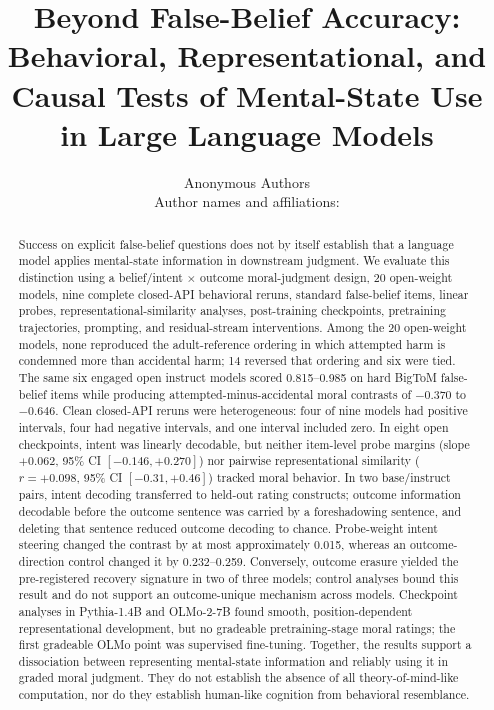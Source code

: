 \documentclass[11pt]{article}
\title{\textbf{Beyond False-Belief Accuracy:}\\
Behavioral, Representational, and Causal Tests of Mental-State Use in Large Language Models}
\author{Anonymous Authors\\
\small Author names and affiliations: \missinginfo}
\date{}
\begin{document}
\maketitle

\begin{abstract}
Success on explicit false-belief questions does not by itself establish that a language model applies mental-state information in downstream judgment.
We evaluate this distinction using a belief/intent $\times$ outcome moral-judgment design, 20 open-weight models, nine complete closed-API behavioral reruns, standard false-belief items, linear probes, representational-similarity analyses, post-training checkpoints, pretraining trajectories, prompting, and residual-stream interventions.
Among the 20 open-weight models, none reproduced the adult-reference ordering in which attempted harm is condemned more than accidental harm; 14 reversed that ordering and six were tied.
The same six engaged open instruct models scored 0.815--0.985 on hard BigToM false-belief items while producing attempted-minus-accidental moral contrasts of $-0.370$ to $-0.646$.
Clean closed-API reruns were heterogeneous: four of nine models had positive intervals, four had negative intervals, and one interval included zero.
In eight open checkpoints, intent was linearly decodable, but neither item-level probe margins (slope $+0.062$, 95\% CI $[-0.146,+0.270]$) nor pairwise representational similarity ($r=+0.098$, 95\% CI $[-0.31,+0.46]$) tracked moral behavior.
In two base/instruct pairs, intent decoding transferred to held-out rating constructs; outcome information decodable before the outcome sentence was carried by a foreshadowing sentence, and deleting that sentence reduced outcome decoding to chance.
Probe-weight intent steering changed the contrast by at most approximately 0.015, whereas an outcome-direction control changed it by 0.232--0.259.
Conversely, outcome erasure yielded the pre-registered recovery signature in two of three models; control analyses bound this result and do not support an outcome-unique mechanism across models.
Checkpoint analyses in Pythia-1.4B and OLMo-2-7B found smooth, position-dependent representational development, but no gradeable pretraining-stage moral ratings; the first gradeable OLMo point was supervised fine-tuning.
Together, the results support a dissociation between representing mental-state information and reliably using it in graded moral judgment.
They do not establish the absence of all theory-of-mind-like computation, nor do they establish human-like cognition from behavioral resemblance.
\end{abstract}
\end{document}
